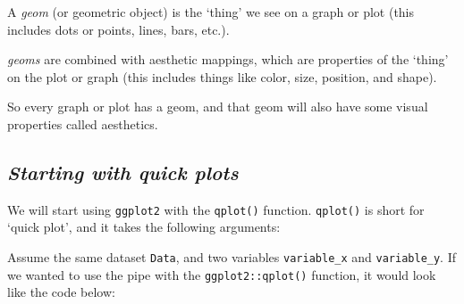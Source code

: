 \documentclass[letterpaper,12pt,twoside,]{pinp}
\begin{document}
A \emph{geom} (or geometric object) is the `thing' we see on a graph or
plot (this includes dots or points, lines, bars, etc.).

\emph{geoms} are combined with aesthetic mappings, which are properties
of the `thing' on the plot or graph (this includes things like color,
size, position, and shape).

So every graph or plot has a geom, and that geom will also have some
visual properties called aesthetics.

\hypertarget{starting-with-quick-plots}{%
\subsection{\texorpdfstring{\textbf{\emph{Starting with quick
plots}}}{Starting with quick plots}}\label{starting-with-quick-plots}}

We will start using \texttt{ggplot2} with the \texttt{qplot()} function.
\texttt{qplot()} is short for `quick plot', and it takes the following
arguments:

\begin{Shaded}
\begin{Highlighting}[]
\SpecialCharTok{::}\NormalTok{(}
                \NormalTok{) }
\end{Highlighting}
\end{Shaded}

Assume the same dataset \texttt{Data}, and two variables
\texttt{variable\_x} and \texttt{variable\_y}. If we wanted to use the
pipe with the \texttt{ggplot2::qplot()} function, it would look like the
code below:

\begin{Shaded}
\begin{Highlighting}[]
\SpecialCharTok{\%\textgreater{}\%}\SpecialCharTok{::}\NormalTok{(} \NormalTok{)}
\end{Highlighting}
\end{Shaded}
\end{document}
